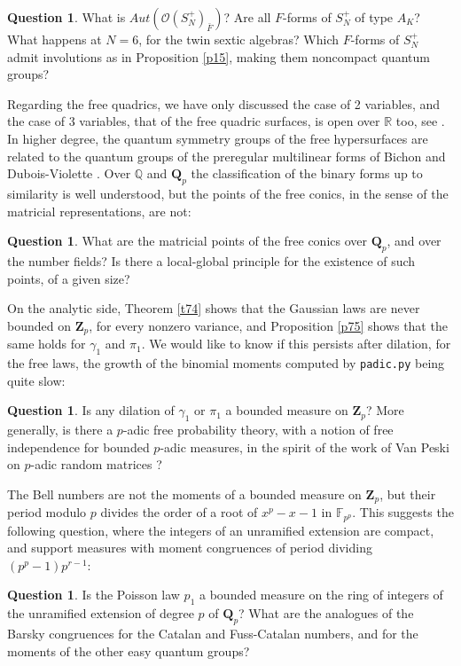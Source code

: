 \documentclass[11pt]{amsart}
\theoremstyle{definition}
\newtheorem{question}[theorem]{Question}
\begin{document}
\begin{question}
What is $Aut(\mathcal O(S_N^+)_{\bar F})$? Are all $F$-forms of $S_N^+$ of type $A_K$? What happens at $N=6$, for the twin sextic algebras? Which $F$-forms of $S_N^+$ admit involutions as in Proposition \ref{p15}, making them noncompact quantum groups?
\end{question}

Regarding the free quadrics, we have only discussed the case of 2 variables, and the case of 3 variables, that of the free quadric surfaces, is open over $\mathbb R$ too, see \cite{fba}. In higher degree, the quantum symmetry groups of the free hypersurfaces are related to the quantum groups of the preregular multilinear forms of Bichon and Dubois-Violette \cite{bdu}. Over $\mathbb Q$ and $\mathbf Q_p$ the classification of the binary forms up to similarity is well understood, but the points of the free conics, in the sense of the matricial representations, are not:

\begin{question}
What are the matricial points of the free conics over $\mathbf Q_p$, and over the number fields? Is there a local-global principle for the existence of such points, of a given size?
\end{question}

On the analytic side, Theorem \ref{t74} shows that the Gaussian laws are never bounded on $\mathbf Z_p$, for every nonzero variance, and Proposition \ref{p75} shows that the same holds for $\gamma_1$ and $\pi_1$. We would like to know if this persists after dilation, for the free laws, the growth of the binomial moments computed by {\tt padic.py} being quite slow:

\begin{question}
Is any dilation of $\gamma_1$ or $\pi_1$ a bounded measure on $\mathbf Z_p$? More generally, is there a $p$-adic free probability theory, with a notion of free independence for bounded $p$-adic measures, in the spirit of the work of Van Peski on $p$-adic random matrices \cite{vpe}?
\end{question}

The Bell numbers are not the moments of a bounded measure on $\mathbf Z_p$, but their period modulo $p$ divides the order of a root of $x^p-x-1$ in $\mathbb F_{p^p}$. This suggests the following question, where the integers of an unramified extension are compact, and support measures with moment congruences of period dividing $(p^p-1)p^{r-1}$:

\begin{question}
Is the Poisson law $p_1$ a bounded measure on the ring of integers of the unramified extension of degree $p$ of $\mathbf Q_p$? What are the analogues of the Barsky congruences for the Catalan and Fuss-Catalan numbers, and for the moments of the other easy quantum groups?
\end{question}
\end{document}
